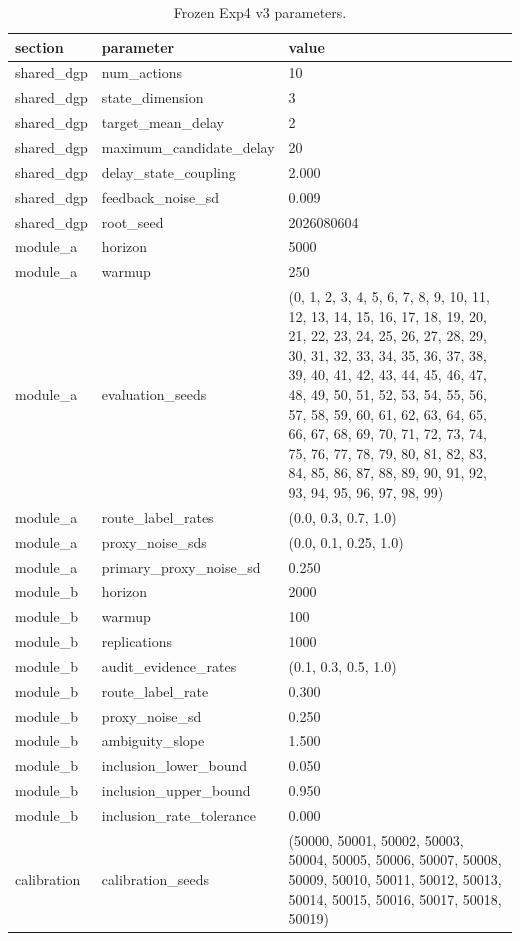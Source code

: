 \begin{table}[t]
\caption{Frozen Exp4 v3 parameters.}
\label{tab:tbl_app_exp4_parameters}
\begin{tabular}{lll}
\toprule
section & parameter & value \\
\midrule
shared_dgp & num_actions & 10 \\
shared_dgp & state_dimension & 3 \\
shared_dgp & target_mean_delay & 2 \\
shared_dgp & maximum_candidate_delay & 20 \\
shared_dgp & delay_state_coupling & 2.000 \\
shared_dgp & feedback_noise_sd & 0.009 \\
shared_dgp & root_seed & 2026080604 \\
module_a & horizon & 5000 \\
module_a & warmup & 250 \\
module_a & evaluation_seeds & (0, 1, 2, 3, 4, 5, 6, 7, 8, 9, 10, 11, 12, 13, 14, 15, 16, 17, 18, 19, 20, 21, 22, 23, 24, 25, 26, 27, 28, 29, 30, 31, 32, 33, 34, 35, 36, 37, 38, 39, 40, 41, 42, 43, 44, 45, 46, 47, 48, 49, 50, 51, 52, 53, 54, 55, 56, 57, 58, 59, 60, 61, 62, 63, 64, 65, 66, 67, 68, 69, 70, 71, 72, 73, 74, 75, 76, 77, 78, 79, 80, 81, 82, 83, 84, 85, 86, 87, 88, 89, 90, 91, 92, 93, 94, 95, 96, 97, 98, 99) \\
module_a & route_label_rates & (0.0, 0.3, 0.7, 1.0) \\
module_a & proxy_noise_sds & (0.0, 0.1, 0.25, 1.0) \\
module_a & primary_proxy_noise_sd & 0.250 \\
module_b & horizon & 2000 \\
module_b & warmup & 100 \\
module_b & replications & 1000 \\
module_b & audit_evidence_rates & (0.1, 0.3, 0.5, 1.0) \\
module_b & route_label_rate & 0.300 \\
module_b & proxy_noise_sd & 0.250 \\
module_b & ambiguity_slope & 1.500 \\
module_b & inclusion_lower_bound & 0.050 \\
module_b & inclusion_upper_bound & 0.950 \\
module_b & inclusion_rate_tolerance & 0.000 \\
calibration & calibration_seeds & (50000, 50001, 50002, 50003, 50004, 50005, 50006, 50007, 50008, 50009, 50010, 50011, 50012, 50013, 50014, 50015, 50016, 50017, 50018, 50019) \\

\end{tabular}
\end{table}
